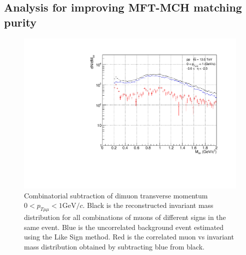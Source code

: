     \subsection{Analysis for improving MFT-MCH matching purity}
    \label{matching improvements}
        \begin{figure}
            \centering
            \includegraphics[keepaspectratio, scale=0.4]{fig/3_6_CB_pt0to1.pdf}
            \caption{Combinatorial subtraction of dimuon transverse momentum $0 < p_{T\mu\mu} < 1 \mathrm{GeV}/c$. Black is the reconstructed invariant mass distribution for all combinations of muons of different signs in the same event. Blue is the uncorrelated background event estimated using the Like Sign method. Red is the correlated muon vs invariant mass distribution obtained by subtracting blue from black.}
            \label{Analysis:Dimuon:pt0to1}
        \end{figure}


